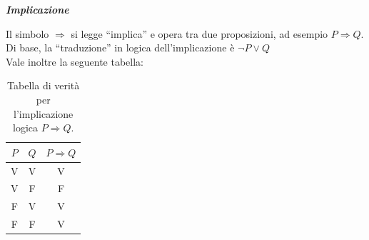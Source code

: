 \documentclass{article}
\theoremstyle{definition}
\newcommand{\virgolette}[1]{``#1''}
\begin{document}
\begin{itemize}
\begin{center}
    \textbf{\textit{Implicazione}}
\end{center}
Il simbolo $\Longrightarrow$ si legge \virgolette{implica} e opera tra due proposizioni, ad esempio $P \Longrightarrow Q$.
\\
Di base, la \virgolette{traduzione} in logica dell'implicazione è $\neg P \vee Q$
\\
Vale inoltre la seguente tabella:
\begin{table}[h]
\centering
\begin{tabular}{|c|c|c|}
\hline
\( P \) & \( Q \) & \( P \Rightarrow Q \) \\ \hline
V      & V      & V                    \\ \hline
V      & F      & F                    \\ \hline
F      & V      & V                    \\ \hline
F      & F      & V                    \\ \hline
\end{tabular}
\caption{Tabella di verità per l'implicazione logica \( P \Rightarrow Q \).}
\label{tab:implicazione}
\end{table}




\end{itemize}
\end{document}
